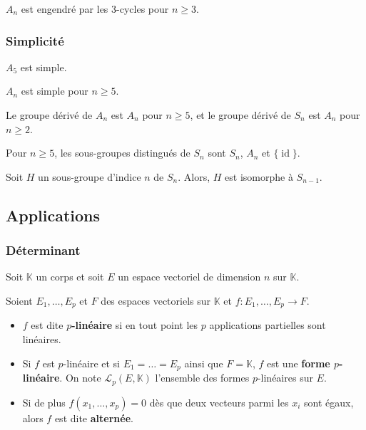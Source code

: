 	\begin{proposition}
		$A_n$ est engendré par les $3$-cycles pour $n \geq 3$.
	\end{proposition}
	
	\subsubsection{Simplicité}
	
	
	\begin{lemma}
		$A_5$ est simple.
	\end{lemma}
	
	
	\begin{theorem}
		$A_n$ est simple pour $n \geq 5$.
	\end{theorem}
	
	\begin{corollary}
		Le groupe dérivé de $A_n$ est $A_n$ pour $n \geq 5$, et le groupe dérivé de $S_n$ est $A_n$ pour $n \geq 2$.
	\end{corollary}
	
	\begin{corollary}
		Pour $n \geq 5$, les sous-groupes distingués de $S_n$ sont $S_n$, $A_n$ et $\{ \operatorname{id} \}$.
	\end{corollary}
	
	\begin{corollary}
		Soit $H$ un sous-groupe d'indice $n$ de $S_n$. Alors, $H$ est isomorphe à $S_{n-1}$.
	\end{corollary}
	
	\subsection{Applications}
	
	\subsubsection{Déterminant}
	
	
	Soit $\mathbb{K}$ un corps et soit $E$ un espace vectoriel de dimension $n$ sur $\mathbb{K}$.
	
	\begin{definition}
		Soient $E_1, \dots, E_p$ et $F$ des espaces vectoriels sur $\mathbb{K}$ et $f : E_1, \dots, E_p \rightarrow F$.
		\begin{itemize}
			\item $f$ est dite \textbf{$p$-linéaire} si en tout point les $p$ applications partielles sont linéaires.
			\item Si $f$ est $p$-linéaire et si $E_1 = \dots = E_p$ ainsi que $F = \mathbb{K}$, $f$ est une \textbf{forme $p$-linéaire}. On note $\mathcal{L}_p(E, \mathbb{K})$ l'ensemble des formes $p$-linéaires sur $E$.
			\item Si de plus $f(x_1, \dots, x_p) = 0$ dès que deux vecteurs parmi les $x_i$ sont égaux, alors $f$ est dite \textbf{alternée}.
		\end{itemize}
	\end{definition}
	
